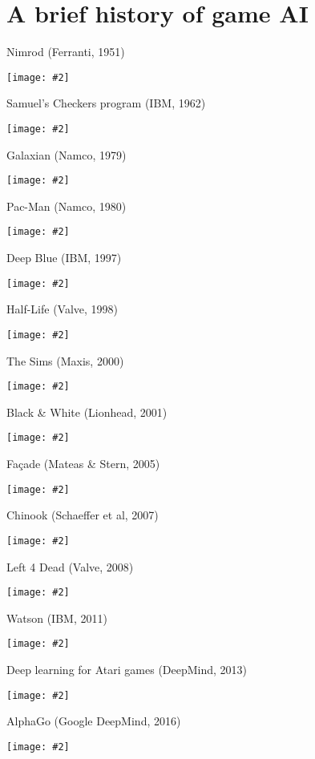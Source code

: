 \part{A brief history of game AI}
\frame{\partpage}

\newcommand{\pictureslideb}[3]{
	\begin{frame}{#1}
		\begin{center}
			#3
			
			\vspace{6pt}
			
			\texttt{[image: \#2]}
		\end{center}
	\end{frame}
}

\newcommand{\pictureslide}[2]{
	\begin{frame}{#1}
		\begin{center}
			\texttt{[image: \#2]}
		\end{center}
	\end{frame}
}

\pictureslide{Nimrod (Ferranti, 1951)}{nimrod}
\pictureslide{Samuel's Checkers program (IBM, 1962)}{samuel}
\pictureslide{Galaxian (Namco, 1979)}{galaxian}
\pictureslide{Pac-Man (Namco, 1980)}{pacman}
\pictureslide{Deep Blue (IBM, 1997)}{deep_blue}
\pictureslide{Half-Life (Valve, 1998)}{half_life}
\pictureslide{The Sims (Maxis, 2000)}{sims}
\pictureslide{Black \& White (Lionhead, 2001)}{black_white}
\pictureslide{Fa\c{c}ade (Mateas \& Stern, 2005)}{facade}
\pictureslide{Chinook (Schaeffer et al, 2007)}{chinook}
\pictureslide{Left 4 Dead (Valve, 2008)}{left_4_dead}
\pictureslide{Watson (IBM, 2011)}{watson}
\pictureslide{Deep learning for Atari games (DeepMind, 2013)}{deepmind_atari}
\pictureslide{AlphaGo (Google DeepMind, 2016)}{alphago}
